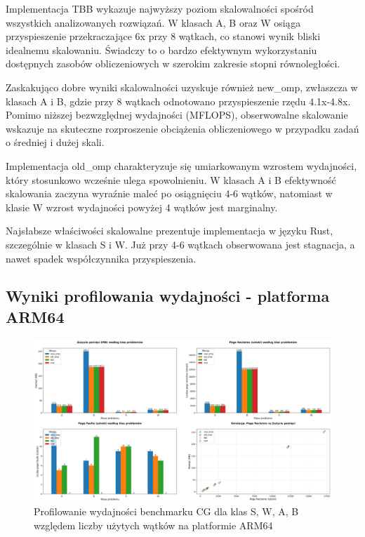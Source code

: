 Implementacja TBB wykazuje najwyższy poziom skalowalności spośród wszystkich analizowanych rozwiązań. W klasach A, B oraz W osiąga przyspieszenie przekraczające 6x przy 8 wątkach, co stanowi wynik bliski idealnemu skalowaniu. Świadczy to o bardzo efektywnym wykorzystaniu dostępnych zasobów obliczeniowych w szerokim zakresie stopni równoległości.

Zaskakująco dobre wyniki skalowalności uzyskuje również new\_omp, zwłaszcza w klasach A i B, gdzie przy 8 wątkach odnotowano przyspieszenie rzędu 4.1x-4.8x. Pomimo niższej bezwzględnej wydajności (MFLOPS), obserwowalne skalowanie wskazuje na skuteczne rozproszenie obciążenia obliczeniowego w przypadku zadań o średniej i dużej skali.

Implementacja old\_omp charakteryzuje się umiarkowanym wzrostem wydajności, który stosunkowo wcześnie ulega spowolnieniu. W klasach A i B efektywność skalowania zaczyna wyraźnie maleć po osiągnięciu 4-6 wątków, natomiast w klasie W wzrost wydajności powyżej 4 wątków jest marginalny.

Najsłabsze właściwości skalowalne prezentuje implementacja w języku Rust, szczególnie w klasach S i W. Już przy 4-6 wątkach obserwowana jest stagnacja, a nawet spadek współczynnika przyspieszenia.
\subsection{Wyniki profilowania wydajności - platforma ARM64}
\begin{figure}[H]
    \centering
    \includegraphics[width=\textwidth]{analiza/images/parallel/cg/arm/chart_01_memory_comparison.png}
    \caption{Profilowanie wydajności benchmarku CG dla klas S, W, A, B względem liczby użytych wątków na platformie ARM64}
    \label{cg_porownanie_zuzycia_pamieci}
\end{figure}

